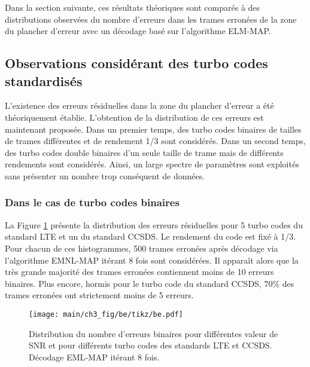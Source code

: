 Dans la section suivante, ces résultats théoriques sont comparés à des distributions observées du nombre d'erreurs dans les
trames erronées de la zone du plancher d'erreur avec un décodage basé sur l'algorithme ELM-MAP.

\subsection{Observations considérant des turbo codes standardisés}
L'existence des erreurs résiduelles dans la zone du plancher d'erreur a été théoriquement établie. L'obtention 
de la distribution de ces erreurs est maintenant proposée. Dans un premier temps, des turbo codes binaires de tailles de 
trames différentes et de rendement 1/3 sont considérés. Dans un second temps, des turbo codes double binaires d'un seule 
taille de trame mais de différents rendements sont considérés. Ainsi, un large spectre de paramètres sont exploités sans
présenter un nombre trop conséquent de données.

\subsubsection{Dans le cas de turbo codes binaires}

La Figure \ref{fig:be} présente la distribution des erreurs résiduelles pour 5 turbo codes du standard LTE et un du 
standard CCSDS. Le rendement du code est fixé à 1/3. Pour chacun de ces histogrammes, 500 trames erronées
après décodage via l'algorithme EMNL-MAP itérant 8 fois sont considérées. Il apparaît alors que la très grande majorité 
des trames erronées contiennent moins de 10 erreurs binaires. 
Plus encore, hormis pour le turbo code du standard CCSDS, 70\% des trames erronées ont strictement moins de 5 erreurs.

\begin{figure}[!ht]
	\centering
	\hspace*{-1cm}
	\texttt{[image: main/ch3\_fig/be/tikz/be.pdf]}
	\caption{Distribution du nombre d'erreurs binaires pour différentes valeur de SNR et pour différents turbo codes des 
	standards LTE et CCSDS. 
	Décodage EML-MAP itérant 8 fois. \label{fig:be}}
\end{figure}

